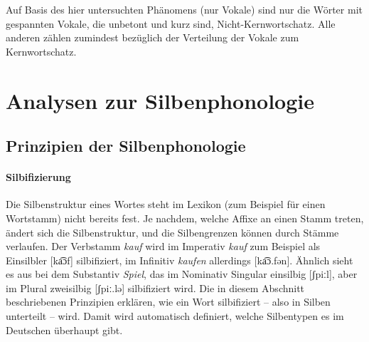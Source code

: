 Auf Basis des hier untersuchten Phänomens (nur Vokale) sind nur die Wörter mit gespannten Vokale, die unbetont und kurz sind, Nicht-Kernwortschatz.
Alle anderen zählen zumindest bezüglich der Verteilung der Vokale zum Kernwortschatz.




\newpage

\section{Analysen zur Silbenphonologie}
\label{sec:phonologie:analysenzursilbenphonologie}

\subsection{Prinzipien der Silbenphonologie}

\paragraph*{Silbifizierung}

Die Silbenstruktur eines Wortes steht im Lexikon (zum Beispiel für einen Wortstamm) nicht bereits fest.
Je nachdem, welche Affixe an einen Stamm treten, ändert sich die Silbenstruktur, und die Silbengrenzen können durch Stämme verlaufen.
Der Verbstamm \textit{kauf} wird im Imperativ \textit{kauf} zum Beispiel als Einsilbler [ka͡ɔf] silbifiziert, im Infinitiv \textit{kaufen} allerdings [ka͡ɔ.fən].
Ähnlich sieht es aus bei dem Substantiv \textit{Spiel}, das im Nominativ Singular einsilbig [ʃpiːl], aber im Plural zweisilbig [ʃpiː.lə] silbifiziert wird.
Die in diesem Abschnitt beschriebenen Prinzipien erklären, wie ein Wort silbifiziert -- also in Silben unterteilt -- wird.
Damit wird automatisch definiert, welche Silbentypen es im Deutschen überhaupt gibt.

